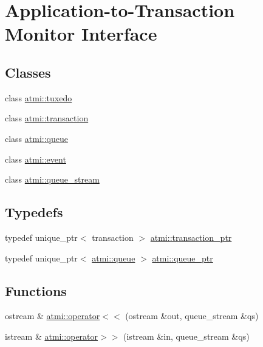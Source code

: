 \hypertarget{group__atmi}{\section{Application-\/to-\/\+Transaction Monitor Interface}
\label{group__atmi}
}
\subsection*{Classes}
\begin{DoxyCompactItemize}
\item 
class \hyperlink{classatmi_1_1tuxedo}{atmi\+::tuxedo}
\item 
class \hyperlink{classatmi_1_1transaction}{atmi\+::transaction}
\item 
class \hyperlink{classatmi_1_1queue}{atmi\+::queue}
\item 
class \hyperlink{classatmi_1_1event}{atmi\+::event}
\item 
class \hyperlink{classatmi_1_1queue__stream}{atmi\+::queue\+\_\+stream}
\end{DoxyCompactItemize}
\subsection*{Typedefs}
\begin{DoxyCompactItemize}
\item 
typedef unique\+\_\+ptr$<$ transaction $>$ \hyperlink{group__atmi_gafc1ae4cdb2829f98c37f27b472fcb867}{atmi\+::transaction\+\_\+ptr}
\item 
typedef unique\+\_\+ptr$<$ \hyperlink{classatmi_1_1queue}{atmi\+::queue} $>$ \hyperlink{group__atmi_gaf8c3e342d908ddc295b73c376b7515ca}{atmi\+::queue\+\_\+ptr}
\end{DoxyCompactItemize}
\subsection*{Functions}
\begin{DoxyCompactItemize}
\item 
ostream \& \hyperlink{group__atmi_gaf3fe9481b5d6e19d1fb56e27baff2154}{atmi\+::operator$<$$<$} (ostream \&out, queue\+\_\+stream \&qs)
\item 
istream \& \hyperlink{group__atmi_gadb0ca17e8de1eecddb5c95b86441ffdc}{atmi\+::operator$>$$>$} (istream \&in, queue\+\_\+stream \&qs)
\end{DoxyCompactItemize}


